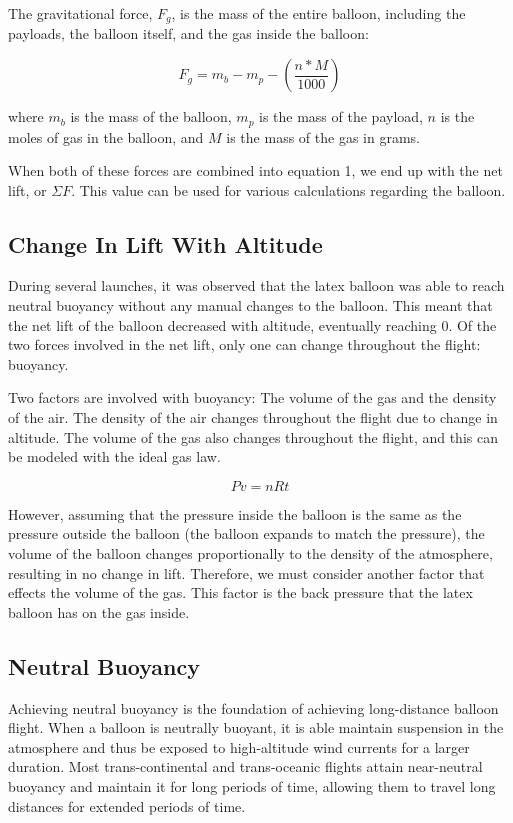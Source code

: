 \documentclass[usaAMS,usenatbib]{mn2e}
\newcommand{\f}[2]{\frac{#1}{#2}}
\begin{document}
The gravitational force, $F_g$, is the mass of the entire balloon, including the payloads, the balloon itself, and the gas inside the balloon:

\begin{equation}
F_{g}=m_b-m_p-(\f{n*M}{1000})
\end{equation}

where $m_b$ is the mass of the balloon, $m_p$ is the mass of the payload, $n$ is the moles of gas in the balloon, and $M$ is the mass of the gas in grams.

When both of these forces are combined into equation 1, we end up with the net lift, or $\Sigma F$. This value can be used for various calculations regarding the balloon. 

\subsection{Change In Lift With Altitude}
\label{sec:backpressure}

During several launches, it was observed that the latex balloon was able to reach neutral buoyancy without any manual changes to the balloon. This meant that the net lift of the balloon decreased with altitude, eventually reaching 0. Of the two forces involved in the net lift, only one can change throughout the flight: buoyancy.

Two factors are involved with buoyancy: The volume of the gas and the density of the air. The density of the air changes throughout the flight due to change in altitude. The volume of the gas also changes throughout the flight, and this can be modeled with the ideal gas law. 

\begin{equation}
Pv=nRt
\end{equation}

However, assuming that the pressure inside the balloon is the same as the pressure outside the balloon (the balloon expands to match the pressure), the volume of the balloon changes proportionally to the density of the atmosphere, resulting in no change in lift. Therefore, we must consider another factor that effects the volume of the gas. This factor is the back pressure that the latex balloon has on the gas inside. 

\subsection{Neutral Buoyancy}

Achieving neutral buoyancy is the foundation of achieving long-distance balloon flight. When a balloon is neutrally buoyant, it is able maintain suspension in the atmosphere and thus be exposed to high-altitude wind currents for a larger duration. Most trans-continental and trans-oceanic flights attain near-neutral buoyancy and maintain it for long periods of time, allowing them to travel long distances for extended periods of time.
\end{document}
